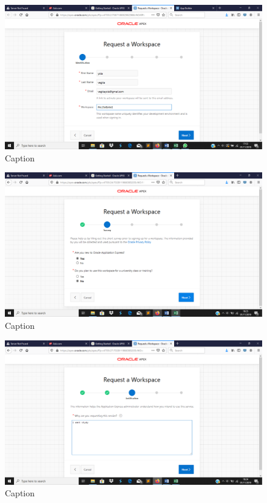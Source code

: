 \begin{enumerate}
    \begin{figure}[!htbp]
        \centering
        \includegraphics[scale=0.3]{figure/3.png}
        \caption{Caption}
        \label{fig:my_label}
    \end{figure}
    
    \beh\begin{figure}[!htbp]
        \centering
        \includegraphics[scale=0.3]{figure/4.png}
        \caption{Caption}
        \label{fig:my_label}
    \end{figure}
    
    \begin{figure}[!htbp]
        \centering
        \includegraphics[scale=0.3]{figure/5.png}
        \caption{Caption}
        \label{fig:my_label}
    \end{figure}
    

\end{enumerate}
